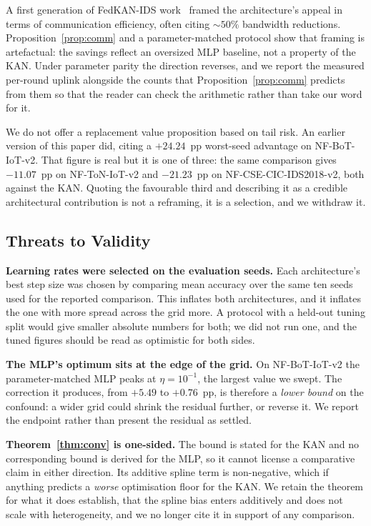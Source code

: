 A first generation of FedKAN-IDS work~\cite{sasse2024evaluating} framed the architecture's
appeal in terms of communication efficiency, often citing $\sim 50\%$ bandwidth reductions.
Proposition~\ref{prop:comm} and a parameter-matched protocol show that framing is artefactual:
the savings reflect an oversized MLP baseline, not a property of the KAN. Under parameter
parity the direction reverses, and we report the measured per-round uplink alongside the
counts that Proposition~\ref{prop:comm} predicts from them so that the reader can check the
arithmetic rather than take our word for it.

We do not offer a replacement value proposition based on tail risk. An earlier version of this
paper did, citing a $+24.24$~pp worst-seed advantage on NF-BoT-IoT-v2. That figure is real but
it is one of three: the same comparison gives $-11.07$~pp on NF-ToN-IoT-v2 and $-21.23$~pp on
NF-CSE-CIC-IDS2018-v2, both against the KAN. Quoting the favourable third and describing it as
a credible architectural contribution is not a reframing, it is a selection, and we withdraw
it.

\subsection{Threats to Validity}

\textbf{Learning rates were selected on the evaluation seeds.} Each architecture's best step
size was chosen by comparing mean accuracy over the same ten seeds used for the reported
comparison. This inflates both architectures, and it inflates the one with more spread across
the grid more. A protocol with a held-out tuning split would give smaller absolute numbers for
both; we did not run one, and the tuned figures should be read as optimistic for both sides.

\textbf{The MLP's optimum sits at the edge of the grid.} On NF-BoT-IoT-v2 the
parameter-matched MLP peaks at $\eta = 10^{-1}$, the largest value we swept. The correction it
produces, from $+5.49$ to $+0.76$~pp, is therefore a \emph{lower bound} on the confound: a
wider grid could shrink the residual further, or reverse it. We report the endpoint rather than
present the residual as settled.

\textbf{Theorem~\ref{thm:conv} is one-sided.} The bound is stated for the KAN and no
corresponding bound is derived for the MLP, so it cannot license a comparative claim in either
direction. Its additive spline term is non-negative, which if anything predicts a \emph{worse}
optimisation floor for the KAN. We retain the theorem for what it does establish, that the
spline bias enters additively and does not scale with heterogeneity, and we no longer cite it
in support of any comparison.

